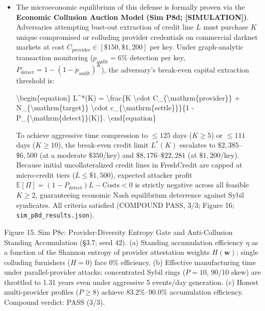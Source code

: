 \documentclass[
]{article}
\newenvironment{Shaded}{}{}
\newcommand{\NormalTok}[1]{#1}
\begin{document}
\begin{itemize}
\begin{itemize}
    aggressive 5 events/day attack; while honest users (\(P \ge 8\)
    diverse providers) achieve \(83.2\%\)--\(90.0\%\) efficiency
    (\(\Delta t_{\mathrm{eff}} \approx \Delta t_{\mathrm{wall}}\)).
    Parallel-provider collusion is thereby structurally neutralised
    without restoring a central registry.
  \item
    The microeconomic equilibrium of this defense is formally proven via
    the \textbf{Economic Collusion Auction Model (Sim P8d;
    {[}SIMULATION{]})}. Adversaries attempting bust-out extraction of
    credit line \(L\) must purchase \(K\) unique compromised or
    colluding provider credentials on commercial darknet markets at cost
    \(C_{\mathrm{provider}} \in [\$150, \$1,200]\) per key. Under
    graph-analytic transaction monitoring (\(p_{\mathrm{audit}} = 6\%\)
    detection per key,
    \(P_{\mathrm{detect}} = 1 - (1 - p_{\mathrm{audit}})^K\)), the
    adversary's break-even capital extraction threshold is:

\begin{Shaded}
\begin{Highlighting}[]
\NormalTok{\textbackslash{}begin\{equation\}}
\NormalTok{L\^{}*(K) = \textbackslash{}frac\{K \textbackslash{}cdot C\_\{\textbackslash{}mathrm\{provider\}\} + N\_\{\textbackslash{}mathrm\{target\}\} \textbackslash{}cdot c\_\{\textbackslash{}mathrm\{settle\}\}\}\{1 {-} P\_\{\textbackslash{}mathrm\{detect\}\}(K)\}.}
\NormalTok{\textbackslash{}end\{equation\}}
\end{Highlighting}
\end{Shaded}

    To achieve aggressive time compression to \(\le 125\) days
    (\(K \ge 5\)) or \(\le 111\) days (\(K \ge 10\)), the break-even
    credit limit \(L^*(K)\) escalates to \(\$2,385\)--\(\$6,500\) (at a
    moderate \(\$350\)/key) and \(\$8,176\)--\(\$22,281\) (at
    \(\$1,200\)/key). Because initial uncollateralized credit lines in
    FreshCredit are capped at micro-credit tiers (\(L \le \$1,500\)),
    expected attacker profit
    \(\mathbb{E}[\Pi] = (1 - P_{\mathrm{detect}})L - \text{Costs} < 0\)
    is strictly negative across all feasible \(K \ge 2\), guaranteeing
    economic Nash equilibrium deterrence against Sybil syndicates. All
    criteria satisfied (COMPOUND PASS, 3/3; Figure 16;
    \texttt{sim\_p8d\_results.json}).
  \end{itemize}
\end{itemize}

Figure 15. Sim P8c: Provider-Diversity Entropy Gate and Anti-Collusion
Standing Accumulation (§3.7; seed 42). (a) Standing accumulation
efficiency \(\eta\) as a function of the Shannon entropy of provider
attestation weights \(H(\mathbf{w})\); single colluding furnishers
(\(H=0\)) face 0\% efficiency. (b) Effective manufacturing time under
parallel-provider attacks: concentrated Sybil rings (\(P=10\), 90/10
skew) are throttled to 1.31 years even under aggressive 5 events/day
generation. (c) Honest multi-provider profiles (\(P \ge 8\)) achieve
\(83.2\%\)--\(90.0\%\) accumulation efficiency. Compound verdict: PASS
(3/3).
\end{document}
